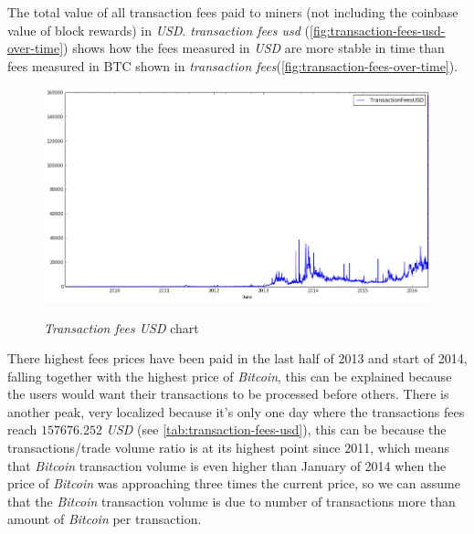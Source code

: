 The total value of all transaction fees paid to miners (not including
the coinbase value of block rewards) in \textit{USD}.
\textit{transaction fees usd}
(\autoref{fig:transaction-fees-usd-over-time}) shows how the fees
measured in \textit{USD} are more stable in time than fees measured in
BTC shown in \textit{transaction
fees}(\autoref{fig:transaction-fees-over-time}).

\begin{figure}[bth]
  \myfloatalign
  {\includegraphics[width=1\linewidth]
    {gfx/transaction-fees-usd-over-time}}
  \caption{\textit{Transaction fees USD} chart}
  \label{fig:transaction-fees-usd-over-time}
\end{figure}

There highest fees prices have been paid in the last half of 2013 and
start of 2014, falling together with the highest price of
\textit{Bitcoin}, this can be explained because the users would want
their transactions to be processed before others. There is another
peak, very localized because it's only one day where the transactions
fees reach $157676.252$ \textit{USD} (see
\autoref{tab:transaction-fees-usd}), this can be because the
transactions/trade volume ratio is at its highest point since 2011,
which means that \textit{Bitcoin} transaction volume is even higher
than January of 2014 when the price of \textit{Bitcoin} was
approaching three times the current price, so we can assume that the
\textit{Bitcoin} transaction volume is due to number of transactions
more than amount of \textit{Bitcoin} per transaction.

